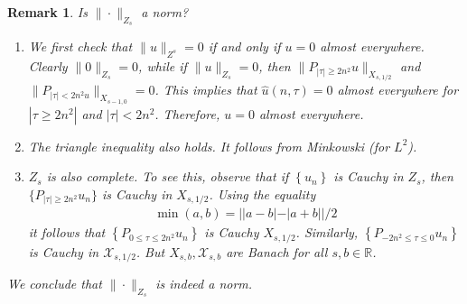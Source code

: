 \documentclass[12pt,reqno]{amsart}
\numberwithin{equation}{section}  %
\newcommand{\rr}{\mathbb{R}}
\newcommand{\wh}{\widehat}
\newtheorem{remark}[theorem]{Remark}
\begin{document}
\begin{framed}
%
%
\begin{remark}
Is $\| \cdot \|_{Z_{s}}$ a norm?
\begin{enumerate}
\item{}
We first check that $\| u \|_{Z^{s}} = 0$ if and only if $u=0$ almost everywhere. 
Clearly $\| 0 \|_{Z_{s}} = 0$, while if $\| u \|_{Z_{s}} = 0$, then $\| P_{| \tau | \ge 2n^{2}}u \|_{X_{s,1/2}}$ and $\|P_{| \tau | < 2n^{2}u}\|_{X_{s-1,0}} = 0$. This implies that $\wh{u}(n, \tau) = 0$ almost everywhere for $| \tau \ge 2n^{2} |$ and $| \tau | < 2n^{2}$. Therefore, $u = 0$ almost everywhere.
\item{}
The triangle inequality also holds. It follows from Minkowski (for $L^{2}$).
\item{}
$Z_{s}$ is also complete. To see this, observe that if $\left \{ u_{n}  \right
\}$ is Cauchy in $Z_{s}$, %
then $\{P_{|\tau| \ge 2n^{2}} u_{n}\}$ is Cauchy in
$X_{s,1/2}$. Using the equality
%
%
\begin{equation*}
\begin{split}
\min(a,b) = | | a-b | - | a+b | |/2
\end{split}
\end{equation*}
%
it follows that $\left \{ P_{0 \le \tau \le 2n^{2}} u_{n} \right \}$ is Cauchy $X_{s,1/2}$. Similarly, $\left \{P_{-2n^{2} \le \tau \le 0} u_{n} \right \}$ is Cauchy in $\mathcal{X}_{s,1/2}$.
But $X_{s,b}, \mathcal{X}_{s,b}$ are Banach for all $s,b \in \rr$. 
%
\end{enumerate}
We conclude that $\| \cdot \|_{Z_{s}}$ is indeed a norm.
\label{rem:}
\end{remark}
%
%

\end{framed}
\end{document}
